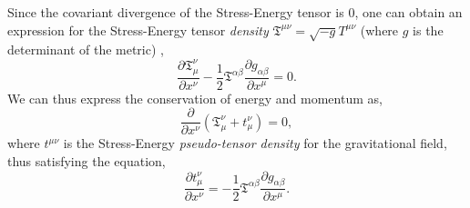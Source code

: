 \documentclass[12pt,a4paper]{report}
\theoremstyle{plain}
\theoremstyle{definition}
\theoremstyle{remark}
\newcommand{\munu}{\mu\nu}
\begin{document}
Since the covariant divergence of the Stress-Energy tensor is $0$, one can obtain an expression for the Stress-Energy tensor \textit{density} $\mathfrak{T}^{\munu} = \sqrt{-g}T^{\munu}$ (where $g$ is the determinant of the metric) \cite{Gupta_1952},
\begin{equation}
    \frac{\partial\mathfrak{T}^{\nu}_{\mu}}{\partial x^{\nu}} - \frac{1}{2}\mathfrak{T}^{\alpha\beta}\frac{\partial g_{\alpha\beta}}{\partial x^{\mu}} = 0.
    \label{eq: StEnergyDen}
\end{equation}
We can thus express the conservation of energy and momentum as,
\begin{equation}
    \frac{\partial}{\partial x^{\nu}}(\mathfrak{T}^{\nu}_{\mu} + t^{\nu}_{\mu}) = 0,
    \label{eq: PseudoStEnergyDen1}
\end{equation}
where $t^{\munu}$ is the Stress-Energy \textit{pseudo-tensor density} \cite{Gupta_1952} for the gravitational field, thus satisfying the equation,
\begin{equation}
    \frac{\partial t^{\nu}_{\mu}}{\partial x^{\nu}} = - \frac{1}{2}\mathfrak{T}^{\alpha\beta}\frac{\partial g_{\alpha\beta}}{\partial x^{\mu}}.
    \label{eq: PseudoStEnergyDen2}
\end{equation}
\end{document}
